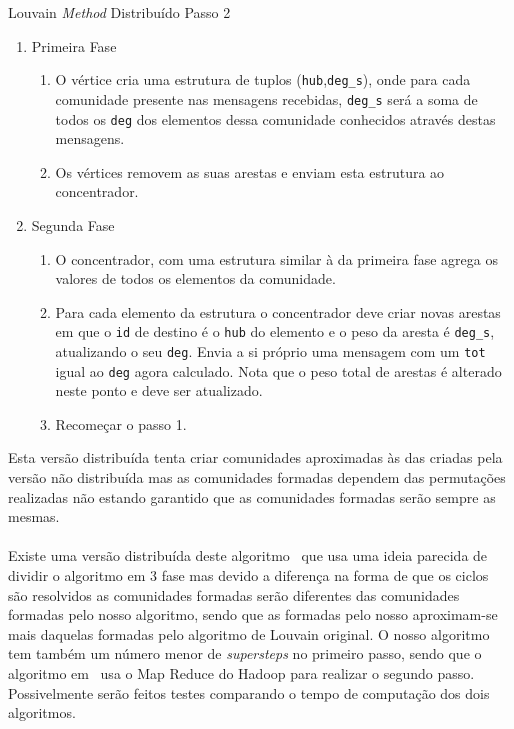 \begin{algorithm}
\caption{Louvain \textit{Method} Distribuído Passo 2}
\label{alg:lmdPasso2}
\begin{enumerate}
	\item Primeira Fase
	
	\begin{enumerate}
		\item O vértice cria uma estrutura de tuplos (\verb|hub|,\verb|deg_s|), onde para cada comunidade presente nas mensagens recebidas, \verb|deg_s| será a soma de todos os \verb|deg| dos elementos dessa comunidade conhecidos através destas mensagens.
		\item Os vértices removem as suas arestas e enviam esta estrutura ao concentrador.
	\end{enumerate}
	
	\item Segunda Fase
	
	
	\begin{enumerate}
		\item O concentrador, com uma estrutura similar à da primeira fase agrega os valores de todos os elementos da comunidade.
		\item Para cada elemento da estrutura o concentrador deve criar novas arestas em que o \verb|id| de destino é o \verb|hub| do elemento e o peso da aresta é \verb|deg_s|, atualizando o seu \verb|deg|. Envia a si próprio uma mensagem com um \verb|tot| igual ao \verb|deg| agora calculado. Nota que o peso total de arestas é alterado neste ponto e deve ser atualizado.
		\item Recomeçar o passo 1.
	\end{enumerate}
\end{enumerate}
\end{algorithm}

Esta versão distribuída tenta criar comunidades aproximadas às das criadas pela versão não distribuída mas as comunidades formadas dependem das permutações realizadas não estando garantido que as comunidades formadas serão sempre as mesmas.

\paragraph{}
Existe uma versão distribuída deste algoritmo~\cite{disLM} que usa uma ideia parecida de dividir o algoritmo em 3 fase mas devido a diferença na forma de que os ciclos são resolvidos as comunidades formadas serão diferentes das comunidades formadas pelo nosso algoritmo, sendo que as formadas pelo nosso aproximam-se mais daquelas formadas pelo algoritmo de Louvain original. O nosso algoritmo tem também um número menor de \textit{supersteps} no primeiro passo, sendo que o algoritmo em~\cite{disLM} usa o Map Reduce do Hadoop para realizar o segundo passo.
Possivelmente serão feitos testes comparando o tempo de computação dos dois algoritmos.

